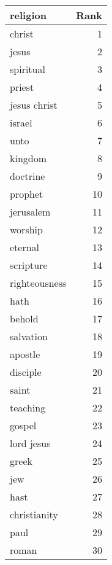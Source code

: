 \begin{table}
\label{tab:religion_terms}
\begin{tabular}{lr}
\toprule
religion & Rank \\
\midrule
christ & 1 \\
jesus & 2 \\
spiritual & 3 \\
priest & 4 \\
jesus christ & 5 \\
israel & 6 \\
unto & 7 \\
kingdom & 8 \\
doctrine & 9 \\
prophet & 10 \\
jerusalem & 11 \\
worship & 12 \\
eternal & 13 \\
scripture & 14 \\
righteousness & 15 \\
hath & 16 \\
behold & 17 \\
salvation & 18 \\
apostle & 19 \\
disciple & 20 \\
saint & 21 \\
teaching & 22 \\
gospel & 23 \\
lord jesus & 24 \\
greek & 25 \\
jew & 26 \\
hast & 27 \\
christianity & 28 \\
paul & 29 \\
roman & 30 \\
\bottomrule
\end{tabular}
\end{table}
